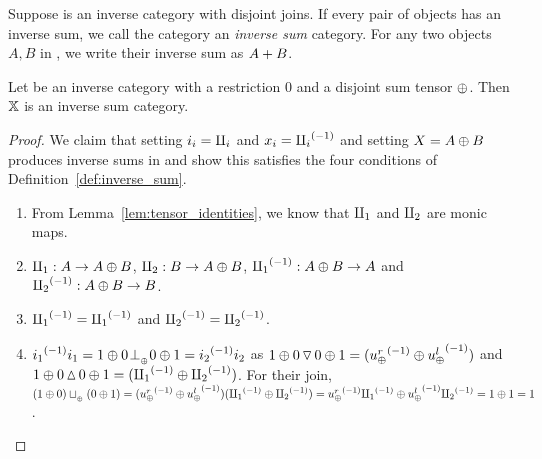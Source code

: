 
\begin{definition}\label{def:inverse_sum_category}
  Suppose \X is an inverse category with disjoint joins. If every pair of objects has an inverse
  sum, we call the category an \emph{inverse sum} category. For any two objects $A,B$ in \X, we
  write their inverse sum as ${{A}+{B}}$.
\end{definition}

\begin{lemma}\label{lem:tensor_disjoint_sum_cats_are_inverse_sum_categories}
  Let \X be an inverse category with a restriction 0 and a disjoint sum tensor $\oplus$. Then $\mathbb{X}$ is
  an inverse sum category.
\end{lemma}
\begin{proof}
  We claim that setting $i_i = \amalg_{i}$ and $x_i = {\amalg_{i}}^{(-1)}$ and setting $X = A\oplus B$ produces inverse
  sums in \X and show this satisfies the four conditions of Definition~\ref{def:inverse_sum}.
  \begin{enumerate}[{(}i{)}]
    \item From Lemma~\ref{lem:tensor_identities}, we know that $\amalg_{1}$ and $\amalg_{2}$ are monic maps.
    \item $\amalg_{1} : A \to A\oplus B$, $\amalg_{2}: B \to A\oplus B$, ${\amalg_{1}}^{(-1)}: A\oplus B \to A$ and ${\amalg_{2}}^{(-1)}: A\oplus B \to B$.
    \item ${\amalg_{1}}^{(-1)} = {\amalg_{1}}^{(-1)}$ and ${\amalg_{2}}^{(-1)} = {\amalg_{2}}^{(-1)}$.
    \item ${i_1}^{(-1)}i_1 = 1\oplus 0 {}_{{}_{}}{\perp_{{}_{\oplus}}} 0\oplus1 = {i_2}^{(-1)}i_2$ as
      $1\oplus0 \operatorname{\triangledown} 0\oplus1 = ({u_{\oplus}^r}^{(-1)}\oplus{\ensuremath{u_{\oplus}^l}}^{(-1)})$ and
      $1\oplus0 \operatorname{\vartriangle} 0\oplus1 = ({\amalg_{1}}^{(-1)}\oplus{\amalg_{2}}^{(-1)})$. For their join,
      $(1\oplus0)\sqcup_{{_{\oplus}}} (0\oplus1) = ({u_{\oplus}^r}^{(-1)}\oplus{\ensuremath{u_{\oplus}^l}}^{(-1)})({\amalg_{1}}^{(-1)}\oplus{\amalg_{2}}^{(-1)}) =
      {u_{\oplus}^r}^{(-1)}{\amalg_{1}}^{(-1)} \oplus {\ensuremath{u_{\oplus}^l}}^{(-1)}{\amalg_{2}}^{(-1)} = 1\oplus1 = 1$.
  \end{enumerate}
\end{proof}

